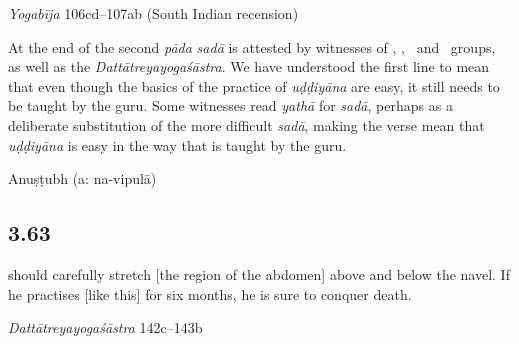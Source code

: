 \begin{ekdosis}
\begin{testimonia}[hp03_062]
\emph{Yogabīja} 106cd–107ab (South Indian recension)
\begin{versinnote}
\end{versinnote}

\end{testimonia}

\begin{philcomm}[hp03_062]
At the end of the second \emph{pāda} \emph{sadā} is attested by witnesses of \textalpha, \texteta, \textzeta\ and \delta \ groups, %
as well as the \emph{Dattātreyayogaśāstra}. We have understood the first line to mean that even though the basics of the practice of \emph{uḍḍiyāna} are easy, it still needs to be taught by the guru. Some witnesses read \emph{yathā} for \emph{sadā}, %
perhaps as a deliberate substitution of the more difficult \emph{sadā}, making the verse mean that \emph{uḍḍiyāna} is easy in the way that is taught by the guru.
\end{philcomm}

\begin{metre}[hp03_062]
Anuṣṭubh (a: na-vipulā)
\end{metre}

\subsection*{3.63}
\begin{translation} should carefully stretch [the region of the abdomen] above and below the navel. If he practises [like this] for six months, he is sure to conquer death.
\end{translation}

\begin{sources}[hp03_063]
\emph{Dattātreyayogaśāstra} 142c–143b
\begin{versinnote}
\tl{\var{142c ataḥ paścāt ] PT, adhaś cāpi \emph{cett.}}\\!}
\end{versinnote}


\end{sources}
\end{ekdosis}
